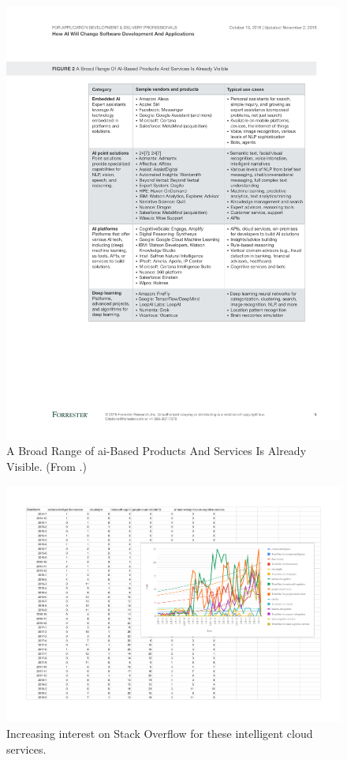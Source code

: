 \begin{figure}[p!]
\centering
\caption[Categorisation of AI-based products and services]{A Broad Range of \gls{ai}-Based Products And Services Is Already Visible. (From \citep{LoGiudice:2016wf}.)}
\label{fig:introduction:ai-products}
\includegraphics[width=\linewidth]{mainmatter/introduction/figures/ai-products}
\end{figure}

\begin{figure}[p!]
\centering
\caption[Increasing interest in the developer community of computer vision APIs]{Increasing interest on Stack Overflow for these intelligent cloud services.}
\label{fig:introduction:stackoverflow-trends}
\includegraphics{mainmatter/introduction/figures/stackoverflow-trends}
\end{figure}

